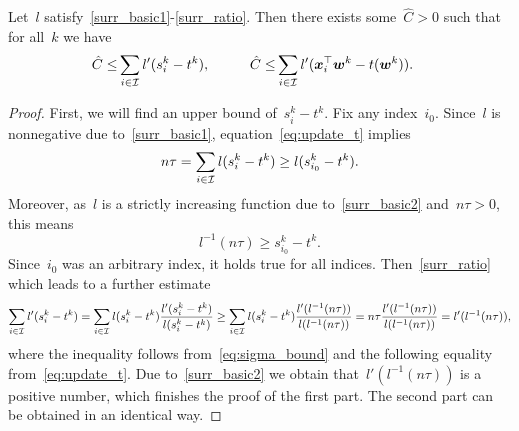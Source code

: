 \begin{lemma}\label{lemma:bound_zero}
  Let~$l$ satisfy~\ref{surr_basic1}-\ref{surr_ratio}. Then there exists some~$\hat{C} > 0$ such that for all~$k$ we have
  \begin{align*}
    \hat{C} \leq & \sum_{i \in \mathcal{I}} l'(s_i^k - t^k), \quad & \quad
    \hat{C} \leq & \sum_{i \in \mathcal{I}} l'(\bm{x}_i^\top \bm{w}^k - t(\bm{w}^k)).
  \end{align*}
\end{lemma}
\begin{proof}
  First, we will find an upper bound of~$s_i^k-t^k$. Fix any index~$i_0$. Since~$l$ is nonnegative due to~\ref{surr_basic1}, equation~\eqref{eq:update_t} implies
  \begin{equation*}
    n\tau = \sum_{i \in \mathcal{I}} l(s_i^k - t^k) \geq l(s_{i_0}^k - t^k).
  \end{equation*}
  Moreover, as~$l$ is a strictly increasing function due to~\ref{surr_basic2} and~$n\tau>0$, this means 
  \begin{equation}\label{eq:sigma_bound}
    l^{-1}(n\tau) \geq s_{i_0}^k-t^k.
  \end{equation}
  Since~$i_0$ was an arbitrary index, it holds true for all indices. Then~\ref{surr_ratio} which leads to a further estimate
  \begin{equation*}
    \sum_{i \in \mathcal{I}} l'(s_i^k - t^k)
      = \sum_{i\in \mathcal{I}} l(s_i^k-t^k) \frac{l'(s_i^k-t^k)}{l(s_i^k-t^k)}
      \geq \sum_{i \in \mathcal{I}} l(s_i^k - t^k) \frac{l'(l^{-1}(n\tau))}{l(l^{-1}(n\tau))}
      = n\tau \frac{l'(l^{-1}(n\tau))}{l(l^{-1}(n\tau))}
      = l'(l^{-1}(n\tau)),
  \end{equation*}
  where the inequality follows from~\eqref{eq:sigma_bound} and the following equality from~\eqref{eq:update_t}. Due to~\ref{surr_basic2} we obtain that~$l'(l^{-1}(n\tau))$ is a positive number, which finishes the proof of the first part. The second part can be obtained in an identical way.
\end{proof}

\newpage

